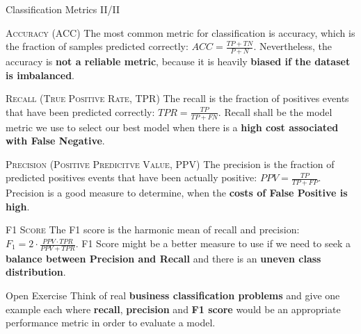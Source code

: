 \documentclass[document.tex]{subfiles}
\begin{document}
    \begin{frame}{Classification Metrics II/II}
        \begin{alertblock}{\textsc{Accuracy (ACC)}}
        The most common metric for classification is accuracy, which is the fraction of samples predicted correctly: $ACC = \frac{TP + TN}{P + N}$. Nevertheless, the accuracy is \textbf{not a reliable metric}, because it is heavily \textbf{biased if the dataset is imbalanced}.
        \end{alertblock}
        
        \begin{alertblock}{\textsc{Recall (True Positive Rate, TPR)}}
        The recall is the fraction of positives events that have been predicted correctly: $TPR = \frac{TP}{TP + FN}$. Recall shall be the model metric we use to select our best model when there is a \textbf{high cost associated with False Negative}.
        \end{alertblock}
        
        \begin{alertblock}{\textsc{Precision (Positive Predicitve Value, PPV)}}
        The precision is the fraction of predicted positives events that have been actually positive: $PPV = \frac{TP}{TP + FP}$. Precision is a good measure to determine, when the \textbf{costs of False Positive is high}.
        \end{alertblock}
        
        \begin{alertblock}{\textsc{F1 Score}}
        The F1 score is the harmonic mean of recall and precision: $F_1 = 2 \cdot \frac{PPV \cdot TPR}{PPV + TPR}$. F1 Score might be a better measure to use if we need to seek a \textbf{balance between Precision and Recall} and there is an \textbf{uneven class distribution}.
        \end{alertblock}
    \end{frame}

    \begin{frame}{Open Exercise }
        Think of real \textbf{business classification problems} and give one example each where \textbf{recall}, \textbf{precision} and \textbf{F1 score} would be an appropriate performance metric in order to evaluate a model.
    \end{frame}

\end{document}

